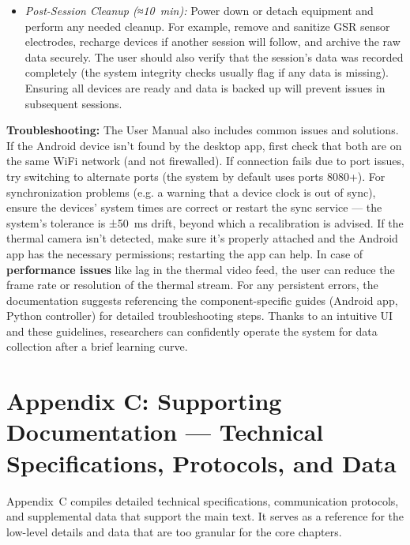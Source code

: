 \begin{itemize}
\item \textit{Post-Session Cleanup (≈10 min):} Power down or detach equipment and
  perform any needed cleanup. For example, remove and sanitize GSR
  sensor electrodes, recharge devices if another session will follow,
  and archive the raw data securely. The user should also verify that
  the session's data was recorded completely (the system integrity
  checks usually flag if any data is missing). Ensuring all devices are
  ready and data is backed up will prevent issues in subsequent
  sessions.

\end{itemize}
\textbf{Troubleshooting:} The User Manual also includes common issues and
solutions. If the Android device isn't found by the desktop app, first
check that both are on the same WiFi network (and not
firewalled)\cite{ContactlessStressThermal2022}.
If connection fails due to port issues, try switching to alternate ports
(the system by default uses ports 8080+). For synchronization problems
(e.g. a warning that a device clock is out of sync), ensure the devices'
system times are correct or restart the sync service --- the system's
tolerance is ±50 ms drift, beyond which a recalibration is
advised\cite{DriverStressThermal2020}.
If the thermal camera isn't detected, make sure it's properly attached
and the Android app has the necessary permissions; restarting the app
can
help\cite{DriverStressThermal2020}.
In case of \textbf{performance issues} like lag in the thermal video feed,
the user can reduce the frame rate or resolution of the thermal
stream\cite{ContactlessStressThermal2022}.
For any persistent errors, the documentation suggests referencing the
component-specific guides (Android app, Python controller) for detailed
troubleshooting
steps\cite{InstantStressSmartphone2019}.
Thanks to an intuitive UI and these guidelines, researchers can
confidently operate the system for data collection after a brief
learning curve.

\section{Appendix C: Supporting Documentation --- Technical Specifications, Protocols, and Data}

Appendix C compiles detailed technical specifications, communication
protocols, and supplemental data that support the main text. It serves
as a reference for the low-level details and data that are too granular
for the core chapters.

